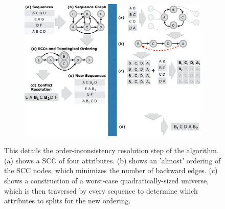 \begin{figure}[t!] 
\begin{minipage}{1\linewidth}
\begin{subfigure}[c]{0.96\linewidth}
\includegraphics[trim={19.2cm 10cm 0 0}, clip, width=\linewidth]{figures/partial_ordering}
\end{subfigure} 
\end{minipage} 
\caption{This details the order-inconsistency resolution step of the algorithm. (a) shows a SCC of four attributes. (b) shows an 'almost' ordering of the SCC nodes, which minimizes the number of backward edges. (c) shows a  construction of a worst-case quadratically-sized universe, which is then traversed by every sequence to determine which attributes to splits for the new ordering.}
\label{fig:conflict_res}
\end{figure}
 

